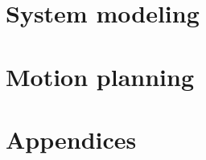 \documentclass[11pt]{book}
\begin{document}
\part{System modeling}
\label{part:system_modeling}
\renewcommand*{\partpath}{system-modeling}





\part{Motion planning}
\label{part:motion_planning}
\renewcommand*{\partpath}{motion-planning}




\part{Appendices}
\renewcommand{\chaptermark}[1]{\markboth{\sffamily\normalsize\bfseries\appendixname\ \thechapter.\ #1}{}}
\appendix
\renewcommand*{\partpath}{appendices}






\renewcommand{\chaptermark}[1]{%
  \markboth{\sffamily\normalsize\bfseries #1}
           {\sffamily\normalsize\bfseries #1}}
\renewcommand{\sectionmark}[1]{%
  \markright{\sffamily\normalsize\bfseries #1}
            {\sffamily\normalsize\bfseries #1}}

\backmatter
{}




\end{document}
